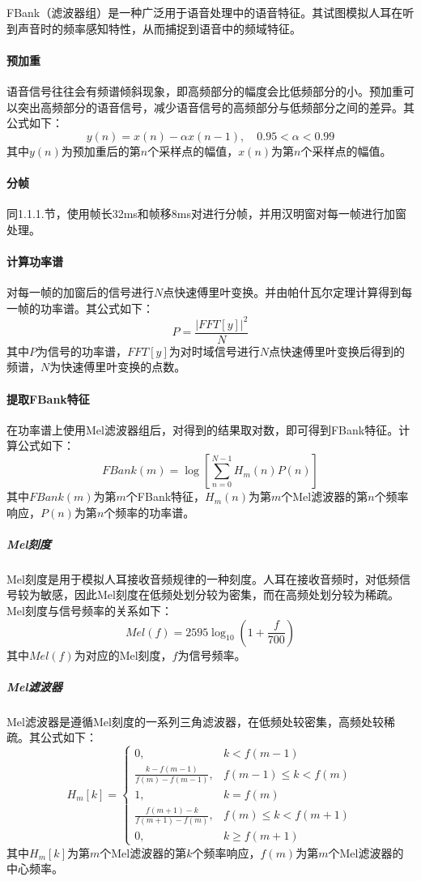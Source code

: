 \documentclass[a4paper]{article}
\begin{document}
FBank（滤波器组）是一种广泛用于语音处理中的语音特征。其试图模拟人耳在听到声音时的频率感知特性，从而捕捉到语音中的频域特征。

\paragraph*{预加重}
语音信号往往会有频谱倾斜现象，即高频部分的幅度会比低频部分的小。预加重可以突出高频部分的语音信号，减少语音信号的高频部分与低频部分之间的差异。其公式如下：
\[y(n) = x(n) - \alpha x(n-1), \quad 0.95 < \alpha < 0.99\]
其中$y(n)$为预加重后的第$n$个采样点的幅值，$x(n)$为第$n$个采样点的幅值。

\paragraph*{分帧}
同1.1.1.节，使用帧长32ms和帧移8ms对进行分帧，并用汉明窗对每一帧进行加窗处理。

\paragraph*{计算功率谱}
对每一帧的加窗后的信号进行$N$点快速傅里叶变换。并由帕什瓦尔定理计算得到每一帧的功率谱。其公式如下：
\[P = \frac{|FFT[y]|^2}{N}\]
其中$P$为信号的功率谱，$FFT[y]$为对时域信号进行$N$点快速傅里叶变换后得到的频谱，$N$为快速傅里叶变换的点数。

\paragraph*{提取FBank特征}
在功率谱上使用Mel滤波器组后，对得到的结果取对数，即可得到FBank特征。计算公式如下：
\[FBank(m) = \log\left[\sum_{n=0}^{N-1}H_m(n)P(n)\right]\]
其中$FBank(m)$为第$m$个FBank特征，$H_m(n)$为第$m$个Mel滤波器的第$n$个频率响应，$P(n)$为第$n$个频率的功率谱。

\subparagraph*{Mel刻度}
Mel刻度是用于模拟人耳接收音频规律的一种刻度。人耳在接收音频时，对低频信号较为敏感，因此Mel刻度在低频处划分较为密集，而在高频处划分较为稀疏。Mel刻度与信号频率的关系如下：
\[Mel(f) = 2595\log_{10}(1+\frac{f}{700})\]
其中$Mel(f)$为对应的Mel刻度，$f$为信号频率。

\subparagraph*{Mel滤波器}
Mel滤波器是遵循Mel刻度的一系列三角滤波器，在低频处较密集，高频处较稀疏。其公式如下：
\[H_m[k] = \begin{cases}
    0, & k<f(m-1)\\
    \frac{k-f(m-1)}{f(m)-f(m-1)}, & f(m-1)\leq k<f(m)\\
    1, & k=f(m)\\
    \frac{f(m+1)-k}{f(m+1)-f(m)}, & f(m)\leq k<f(m+1)\\
    0, & k\geq f(m+1)
\end{cases}\]
其中$H_m[k]$为第$m$个Mel滤波器的第$k$个频率响应，$f(m)$为第$m$个Mel滤波器的中心频率。
\end{document}
